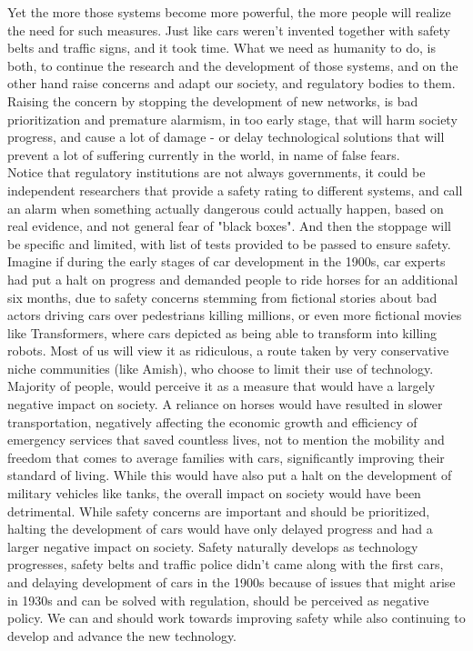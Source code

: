 \documentclass{article}
\begin{document}
Yet the more those systems become more powerful, the more people will realize the need for such measures. Just like cars weren't invented together with safety belts and traffic signs, and it took time. What we need as humanity to do, is both, to continue the research and the development of those systems, and on the other hand raise concerns and adapt our society, and regulatory bodies to them. Raising the concern by stopping the development of new networks, is bad prioritization and premature alarmism, in too early stage, that will harm society progress, and cause a lot of damage - or delay technological solutions that will prevent a lot of suffering currently in the world, in name of false fears.\\

Notice that regulatory institutions are not always governments, it could be independent researchers that provide a safety rating to different systems, and call an alarm when something actually dangerous could actually happen, based on real evidence, and not general fear of "black boxes". And then the stoppage will be specific and limited, with list of tests provided to be passed to ensure safety. \\

Imagine if during the early stages of car development in the 1900s, car experts had put a halt on progress and demanded people to ride horses for an additional six months, due to safety concerns stemming from fictional stories about bad actors driving cars over pedestrians killing millions, or even more fictional movies like Transformers\cite{transformers_movie}, where cars depicted as being able to transform into killing robots. Most of us will view it as ridiculous, a route taken by very conservative niche communities (like Amish), who choose to limit their use of technology. Majority of people, would perceive it as a measure that would have a largely negative impact on society. A reliance on horses would have resulted in slower transportation, negatively affecting the economic growth and efficiency of emergency services that saved countless lives, not to mention the mobility and freedom that comes to average families with cars, significantly improving their standard of living. While this would have also put a halt on the development of military vehicles like tanks, the overall impact on society would have been detrimental. While safety concerns are important and should be prioritized, halting the development of cars would have only delayed progress and had a larger negative impact on society. Safety naturally develops as technology progresses, safety belts and traffic police didn't came along with the first cars, and delaying development of cars in the 1900s because of issues that might arise in 1930s and can be solved with regulation, should be perceived as negative policy. We can and should work towards improving safety while also continuing to develop and advance the new technology.\\
\end{document}
